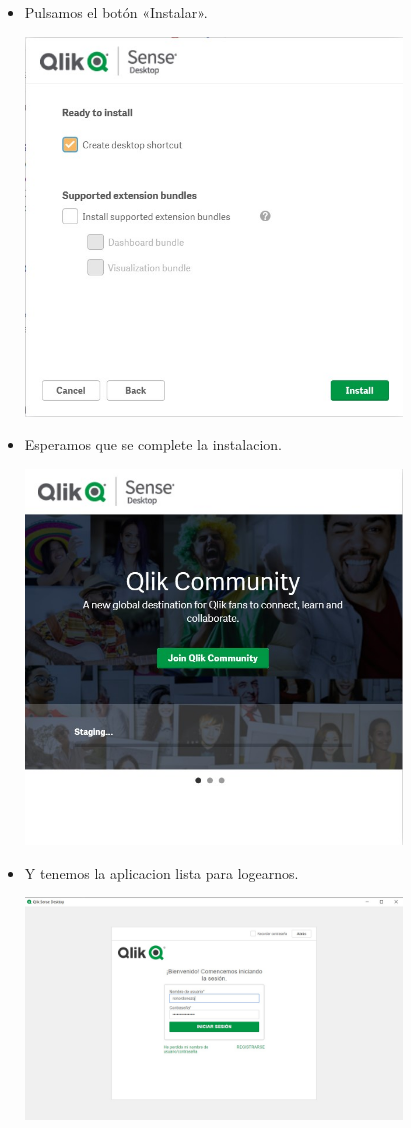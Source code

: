\begin{itemize}
\begin{center}
\end{center}
		\item Pulsamos el botón «Instalar».
\begin{center}
	\includegraphics[width=10cm]{./Imagenes/img3} 
\end{center}
\item Esperamos que se complete la instalacion.
\begin{center}
	\includegraphics[width=10cm]{./Imagenes/img4} 
\end{center}
\item Y tenemos la aplicacion lista para logearnos.
\begin{center}
	\includegraphics[width=10cm]{./Imagenes/img6} 
\end{center}
\end{itemize}


